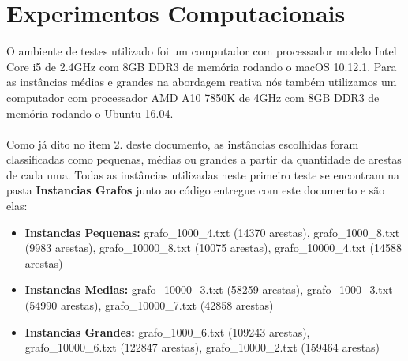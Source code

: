 \documentclass[a4paper, 12pt]{article}
\begin{document}
\section{Experimentos Computacionais}

O ambiente de testes utilizado foi um computador com processador modelo Intel Core i5 de 2.4GHz com 8GB DDR3 de memória rodando o macOS 10.12.1. Para as instâncias médias e grandes na abordagem reativa nós também utilizamos um computador
com processador AMD A10 7850K de 4GHz com 8GB DDR3 de memória rodando o Ubuntu 16.04.
\\ \\ \indent Como já dito no item 2. deste documento, as instâncias escolhidas foram classificadas como pequenas, médias ou grandes
a partir da quantidade de arestas de cada uma. Todas as instâncias utilizadas neste primeiro teste se encontram na pasta \textbf{Instancias Grafos} junto ao código entregue com este documento e são elas:

\begin{itemize}
  \item \textbf{Instancias Pequenas:} grafo\_1000\_4.txt (14370 arestas), grafo\_1000\_8.txt (9983 arestas), grafo\_10000\_8.txt (10075 arestas), grafo\_10000\_4.txt (14588 arestas)
  \item \textbf{Instancias Medias:} grafo\_10000\_3.txt (58259 arestas), grafo\_1000\_3.txt (54990 arestas), grafo\_10000\_7.txt (42858 arestas)
  \item \textbf{Instancias Grandes:} grafo\_1000\_6.txt (109243 arestas), grafo\_10000\_6.txt (122847 arestas), grafo\_10000\_2.txt (159464 arestas)
\end{itemize}
\end{document}
